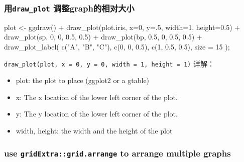 \documentclass[
]{article}
\newenvironment{Shaded}{}{}
\newcommand{\AttributeTok}[1]{\textcolor[rgb]{0.49,0.56,0.16}{#1}}
\newcommand{\DecValTok}[1]{\textcolor[rgb]{0.25,0.63,0.44}{#1}}
\newcommand{\FloatTok}[1]{\textcolor[rgb]{0.25,0.63,0.44}{#1}}
\newcommand{\FunctionTok}[1]{\textcolor[rgb]{0.02,0.16,0.49}{#1}}
\newcommand{\NormalTok}[1]{#1}
\newcommand{\OtherTok}[1]{\textcolor[rgb]{0.00,0.44,0.13}{#1}}
\newcommand{\SpecialCharTok}[1]{\textcolor[rgb]{0.25,0.44,0.63}{#1}}
\newcommand{\StringTok}[1]{\textcolor[rgb]{0.25,0.44,0.63}{#1}}
\begin{document}
\hypertarget{ux7528drawplot-ux8c03ux6574graphux7684ux76f8ux5bf9ux5927ux5c0f}{%
\subsubsection{\texorpdfstring{用\texttt{draw\_plot}
调整graph的相对大小}{用draw\_plot 调整graph的相对大小}}\label{ux7528drawplot-ux8c03ux6574graphux7684ux76f8ux5bf9ux5927ux5c0f}}

\begin{Shaded}
\begin{Highlighting}[]
\NormalTok{plot }\OtherTok{\textless{}{-}} 
  \FunctionTok{ggdraw}\NormalTok{() }\SpecialCharTok{+}
  \FunctionTok{draw\_plot}\NormalTok{(plot.iris, }\AttributeTok{x=}\DecValTok{0}\NormalTok{, }\AttributeTok{y=}\NormalTok{.}\DecValTok{5}\NormalTok{, }\AttributeTok{width=}\DecValTok{1}\NormalTok{, }\AttributeTok{height=}\FloatTok{0.5}\NormalTok{) }\SpecialCharTok{+}
  \FunctionTok{draw\_plot}\NormalTok{(sp, }\DecValTok{0}\NormalTok{, }\DecValTok{0}\NormalTok{, }\FloatTok{0.5}\NormalTok{, }\FloatTok{0.5}\NormalTok{) }\SpecialCharTok{+}
  \FunctionTok{draw\_plot}\NormalTok{(bp, }\FloatTok{0.5}\NormalTok{, }\DecValTok{0}\NormalTok{, }\FloatTok{0.5}\NormalTok{, }\FloatTok{0.5}\NormalTok{) }\SpecialCharTok{+}
  \FunctionTok{draw\_plot\_label}\NormalTok{(}
      \FunctionTok{c}\NormalTok{(}\StringTok{"A"}\NormalTok{, }\StringTok{"B"}\NormalTok{, }\StringTok{"C"}\NormalTok{), }\FunctionTok{c}\NormalTok{(}\DecValTok{0}\NormalTok{, }\DecValTok{0}\NormalTok{, }\FloatTok{0.5}\NormalTok{), }\FunctionTok{c}\NormalTok{(}\DecValTok{1}\NormalTok{, }\FloatTok{0.5}\NormalTok{, }\FloatTok{0.5}\NormalTok{), }\AttributeTok{size =} \DecValTok{15}
\NormalTok{  );}
\end{Highlighting}
\end{Shaded}

\texttt{draw\_plot(plot,\ x\ =\ 0,\ y\ =\ 0,\ width\ =\ 1,\ height\ =\ 1)}
详解：

\begin{itemize}
\item
  plot: the plot to place (ggplot2 or a gtable)
\item
  x: The x location of the lower left corner of the plot.
\item
  y: The y location of the lower left corner of the plot.
\item
  width, height: the width and the height of the plot
\end{itemize}

\hypertarget{use-gridextragridarrange-to-arrange-multiple-graphs}{%
\subsubsection{\texorpdfstring{use \texttt{gridExtra::grid.arrange} to
arrange multiple
graphs}{use gridExtra::grid.arrange to arrange multiple graphs}}\label{use-gridextragridarrange-to-arrange-multiple-graphs}}
\end{document}
